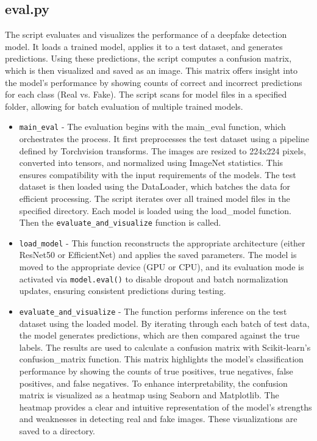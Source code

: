 \documentclass[conference]{IEEEtran}
\begin{document}
    \subsection*{eval.py} 
    The script evaluates and visualizes the performance of a deepfake detection model. It loads a trained model, applies it to a test dataset, and generates predictions. Using these predictions, the script computes a confusion matrix, which is then visualized and saved as an image. This matrix offers insight into the model’s performance by showing counts of correct and incorrect predictions for each class (Real vs. Fake). The script scans for model files in a specified folder, allowing for batch evaluation of multiple trained models.
    \begin{itemize}
        \item \texttt{main\_eval} - The evaluation begins with the main\_eval function, which orchestrates the process. It first preprocesses the test dataset using a pipeline defined by Torchvision transforms. The images are resized to 224x224 pixels, converted into tensors, and normalized using ImageNet statistics. This ensures compatibility with the input requirements of the models. The test dataset is then loaded using the DataLoader, which batches the data for efficient processing. The script iterates over all trained model files in the specified directory. Each model is loaded using the load\_model function. Then the \texttt{evaluate\_and\_visualize} function is called. \\
        \item \texttt{load\_model} - This function reconstructs the appropriate architecture (either ResNet50 or EfficientNet) and applies the saved parameters. The model is moved to the appropriate device (GPU or CPU), and its evaluation mode is activated via \texttt{model.eval()} to disable dropout and batch normalization updates, ensuring consistent predictions during testing. \\
        \item \texttt{evaluate\_and\_visualize} - The function performs inference on the test dataset using the loaded model. By iterating through each batch of test data, the model generates predictions, which are then compared against the true labels. The results are used to calculate a confusion matrix with Scikit-learn’s confusion\_matrix function. This matrix highlights the model's classification performance by showing the counts of true positives, true negatives, false positives, and false negatives. To enhance interpretability, the confusion matrix is visualized as a heatmap using Seaborn and Matplotlib. The heatmap provides a clear and intuitive representation of the model's strengths and weaknesses in detecting real and fake images. These visualizations are saved to a directory.
        
    \end{itemize}
\end{document}
